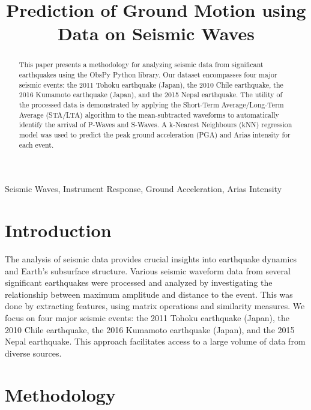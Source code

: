 \documentclass[conference]{IEEEtran}
\date{}
\title{Prediction of Ground Motion using Data on Seismic Waves}
\begin{document}
\maketitle
\begin{abstract}
This paper presents a methodology for analyzing seismic data from significant
earthquakes using the ObsPy Python library. Our dataset encompasses four major
seismic events: the 2011 Tohoku earthquake (Japan), the 2010 Chile earthquake,
the 2016 Kumamoto earthquake (Japan), and the 2015 Nepal earthquake. The utility
of the processed data is demonstrated by applying the Short-Term
Average/Long-Term Average (STA/LTA) algorithm to the mean-subtracted waveforms
to automatically identify the arrival of P-Waves and S-Waves. A k-Nearest
Neighbours (kNN) regression model was used to predict the peak ground
acceleration (PGA) and Arias intensity for each event.


\end{abstract}


\begin{IEEEkeywords}

Seismic Waves, Instrument Response, Ground Acceleration, Arias Intensity

\end{IEEEkeywords}
\section{Introduction}
\label{sec:orga2d6b84}
The analysis of seismic data provides crucial insights into earthquake dynamics
and Earth's subsurface structure. Various seismic waveform data from several
significant earthquakes were processed and analyzed by investigating the
relationship between maximum amplitude and distance to the event. This was done
by extracting features, using matrix operations and similarity measures. We
focus on four major seismic events: the 2011 Tohoku earthquake (Japan), the 2010
Chile earthquake, the 2016 Kumamoto earthquake (Japan), and the 2015 Nepal
earthquake. This approach facilitates access to a large volume of data from
diverse sources.
\section{Methodology}
\label{sec:orgd0acd6f}
\end{document}
